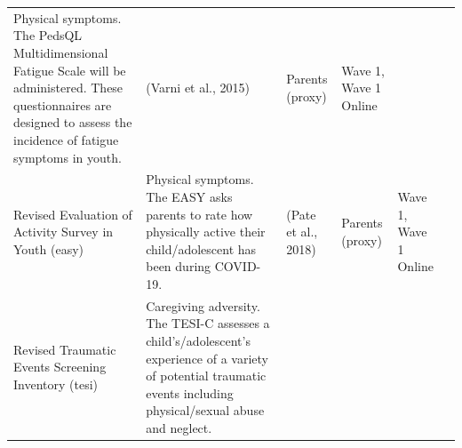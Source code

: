 \documentclass[
]{book}
\begin{document}
\begin{longtable}[]{@{}llllll@{}}
\begin{minipage}[t]{0.18\columnwidth}
Physical symptoms. The PedsQL Multidimensional Fatigue Scale will be administered. These questionnaires are designed to assess the incidence of fatigue symptoms in youth.\strut
\end{minipage} & \begin{minipage}[t]{0.15\columnwidth}\raggedright
(Varni et al., 2015)\strut
\end{minipage} & \begin{minipage}[t]{0.16\columnwidth}\raggedright
Parents (proxy)\strut
\end{minipage} & \begin{minipage}[t]{0.06\columnwidth}\raggedright
Wave 1, Wave 1 Online\strut
\end{minipage} & \begin{minipage}[t]{0.10\columnwidth}\raggedright
\strut
\end{minipage}\tabularnewline
\begin{minipage}[t]{0.18\columnwidth}\raggedright
Revised Evaluation of Activity Survey in Youth (easy)\strut
\end{minipage} & \begin{minipage}[t]{0.18\columnwidth}\raggedright
Physical symptoms. The EASY asks parents to rate how physically active their child/adolescent has been during COVID-19.\strut
\end{minipage} & \begin{minipage}[t]{0.15\columnwidth}\raggedright
(Pate et al., 2018)\strut
\end{minipage} & \begin{minipage}[t]{0.16\columnwidth}\raggedright
Parents (proxy)\strut
\end{minipage} & \begin{minipage}[t]{0.06\columnwidth}\raggedright
Wave 1, Wave 1 Online\strut
\end{minipage} & \begin{minipage}[t]{0.10\columnwidth}\raggedright
\strut
\end{minipage}\tabularnewline
\begin{minipage}[t]{0.18\columnwidth}\raggedright
Revised Traumatic Events Screening Inventory (tesi)\strut
\end{minipage} & \begin{minipage}[t]{0.18\columnwidth}\raggedright
Caregiving adversity. The TESI-C assesses a child's/adolescent's experience of a variety of potential traumatic events including physical/sexual abuse and neglect.\strut
\end{minipage} & \begin{minipage}[t]{0.15\columnwidth}\raggedright

\end{minipage}
\end{longtable}
\end{document}
